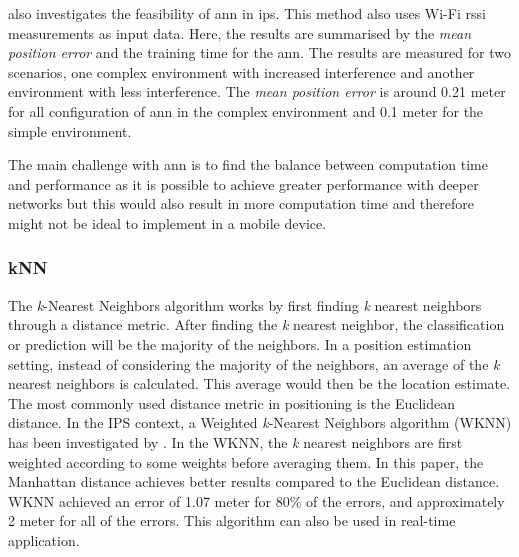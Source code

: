 \cite{ANN02} also investigates the feasibility of \gls{ann} in \gls{ips}. This method also uses Wi-Fi \gls{rssi} measurements as input data. Here, the results are summarised by the \textit{mean position error} and the training time for the \gls{ann}. The results are measured for two scenarios, one complex environment with increased interference and another environment with less interference. The \textit{mean position error} is around 0.21 meter for all configuration of \gls{ann} in the complex environment and 0.1 meter for the simple environment. 

The main challenge with \gls{ann} is to find the balance between computation time and performance as it is possible to achieve greater performance with deeper networks but this would also result in more computation time and therefore might not be ideal to implement in a mobile device.

\subsubsection{kNN}
The \textit{k}-Nearest Neighbors algorithm works by first finding \textit{k} nearest neighbors through a distance metric. After finding the \textit{k} nearest neighbor, the classification or prediction will be the majority of the neighbors. In a position estimation setting, instead of considering the majority of the neighbors, an average of the \textit{k} nearest neighbors is calculated. This average would then be the location estimate. The most commonly used distance metric in positioning is the Euclidean distance. \cite{IPS01} In the IPS context, a Weighted \textit{k}-Nearest Neighbors algorithm (WKNN) has been investigated by \cite{wknn}. In the WKNN, the \textit{k} nearest neighbors are first weighted according to some weights before averaging them. In this paper, the Manhattan distance achieves better results compared to the Euclidean distance. WKNN achieved an error of 1.07 meter for 80\% of the errors, and approximately 2 meter for all of the errors. This algorithm can also be used in real-time application.

